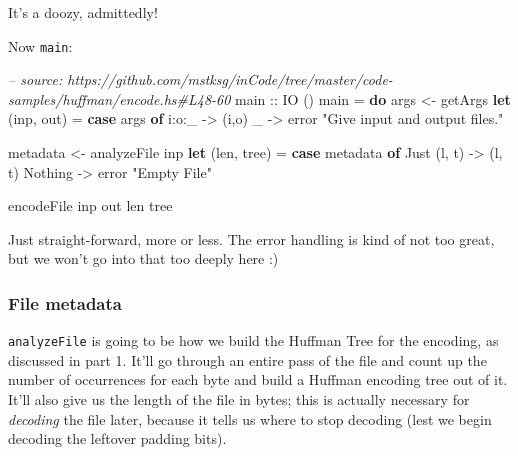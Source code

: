\documentclass[]{article}
\newenvironment{Shaded}{}{}
\newcommand{\KeywordTok}[1]{\textcolor[rgb]{0.00,0.44,0.13}{\textbf{{#1}}}}
\newcommand{\DataTypeTok}[1]{\textcolor[rgb]{0.56,0.13,0.00}{{#1}}}
\newcommand{\StringTok}[1]{\textcolor[rgb]{0.25,0.44,0.63}{{#1}}}
\newcommand{\CommentTok}[1]{\textcolor[rgb]{0.38,0.63,0.69}{\textit{{#1}}}}
\newcommand{\OtherTok}[1]{\textcolor[rgb]{0.00,0.44,0.13}{{#1}}}
\newcommand{\FunctionTok}[1]{\textcolor[rgb]{0.02,0.16,0.49}{{#1}}}
\newcommand{\NormalTok}[1]{{#1}}
\begin{document}
It's a doozy, admittedly!

Now \texttt{main}:

\begin{Shaded}
\begin{Highlighting}[]
\CommentTok{-- source: https://github.com/mstksg/inCode/tree/master/code-samples/huffman/encode.hs#L48-60}
\OtherTok{main ::} \DataTypeTok{IO} \NormalTok{()}
\NormalTok{main }\FunctionTok{=} \KeywordTok{do}
    \NormalTok{args     }\OtherTok{<-} \NormalTok{getArgs}
    \KeywordTok{let} \NormalTok{(inp, out)  }\FunctionTok{=} \KeywordTok{case} \NormalTok{args }\KeywordTok{of}
                        \NormalTok{i}\FunctionTok{:}\NormalTok{o}\FunctionTok{:}\NormalTok{_      }\OtherTok{->} \NormalTok{(i,o)}
                        \NormalTok{_          }\OtherTok{->} \NormalTok{error }\StringTok{"Give input and output files."}

    \NormalTok{metadata }\OtherTok{<-} \NormalTok{analyzeFile inp}
    \KeywordTok{let} \NormalTok{(len, tree) }\FunctionTok{=} \KeywordTok{case} \NormalTok{metadata }\KeywordTok{of}
                        \DataTypeTok{Just} \NormalTok{(l, t) }\OtherTok{->} \NormalTok{(l, t)}
                        \DataTypeTok{Nothing}     \OtherTok{->} \NormalTok{error }\StringTok{"Empty File"}

    \NormalTok{encodeFile inp out len tree}
\end{Highlighting}
\end{Shaded}

Just straight-forward, more or less. The error handling is kind of not too
great, but we won't go into that too deeply here :)

\subsubsection{File metadata}\label{file-metadata}

\texttt{analyzeFile} is going to be how we build the Huffman Tree for the
encoding, as discussed in part 1. It'll go through an entire pass of the file
and count up the number of occurrences for each byte and build a Huffman
encoding tree out of it. It'll also give us the length of the file in bytes;
this is actually necessary for \emph{decoding} the file later, because it tells
us where to stop decoding (lest we begin decoding the leftover padding bits).
\end{document}

